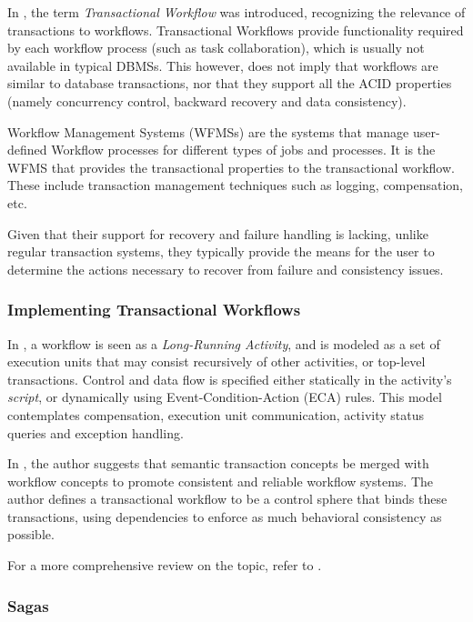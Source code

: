 \documentclass{llncs}
\begin{document}
In \cite{sheth1993transactional}, the term {\it Transactional
  Workflow} was introduced, recognizing the relevance of transactions
to workflows. Transactional Workflows provide functionality required
by each workflow process (such as task collaboration), which is
usually not available in typical DBMSs. This however, does not imply
that workflows are similar to database transactions, nor that they
support all the ACID properties (namely concurrency control, backward
recovery and data consistency).

Workflow Management Systems (WFMSs) are the systems that manage
user-defined Workflow processes for different types of jobs and
processes. It is the WFMS that provides the transactional properties
to the transactional workflow. These include transaction management
techniques such as logging, compensation, etc.

Given that their support for recovery and failure handling is lacking,
unlike regular transaction systems, they typically provide the means
for the user to determine the actions necessary to recover from
failure and consistency issues.

\subsubsection{Implementing Transactional Workflows}

In \cite{dayal1990organizing}, a workflow is seen as a {\it
  Long-Running Activity}, and is modeled as a set of execution units
that may consist recursively of other activities, or top-level
transactions. Control and data flow is specified either statically in
the activity's {\it script}, or dynamically using
Event-Condition-Action (ECA) rules. This model contemplates
compensation, execution unit communication, activity status queries
and exception handling.

In \cite{weikum1993extending}, the author suggests that semantic
transaction concepts be merged with workflow concepts to promote
consistent and reliable workflow systems. The author defines a
transactional workflow to be a control sphere that binds these
transactions, using dependencies to enforce as much behavioral
consistency as possible.

For a more comprehensive review on the topic, refer to
\cite{worah1997transactions}.

\subsubsection{Sagas}
\end{document}
